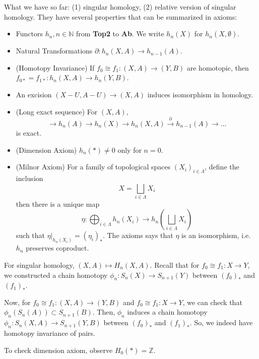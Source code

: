 
What we have so far: (1) singular homology, (2) relative version of singular homology. They have several properties that can be summarized in axioms:

\begin{definition}
	\label{defn:HomologyTheory}
	\begin{itemize}
		\item Functors $h_n, n \in \mathbb{N}$ from \textbf{Top2} to \textbf{Ab}. We write $h_n(X)$ for $h_n(X, \emptyset )$.
		\item Natural Transformations $\partial: h_n(X, A) \to h_{n - 1}(A)$. 
		\item (Homotopy Invariance) If $f_0 \cong f_1: (X, A) \to (Y, B)$ are homotopic, then $f_{0 *} = f_{1 *}: h_n(X, A) \to h_n(Y, B)$.
		\item An excision $\left( X - U, A - U \right) \to (X, A)$ induces isomorphism in homology.
		\item (Long exact sequence) For $(X, A)$, 
			\[
				\to h_n(A) \to h_n(X) \to h_n(X, A) \xrightarrow{\partial} h_{n - 1}(A) \to \ldots
			\] 
			is exact.
		\item (Dimension Axiom) $h_n(*) \neq 0$ only for $n = 0$.
		\item (Milnor Axiom) For a family of topological spaces $(X_i)_{i \in \Lambda}$, define the inclusion
			\[
				X = \bigsqcup_{i \in \Lambda} X_i
			\] 
			then there is a unique map
			\[
				\eta: \bigoplus_{i \in \Lambda} h_n(X_i) \to h_n\left( \bigsqcup_{i \in \Lambda} X_i \right) 
			\] 
			such that $\eta| _{h_n(X_i)} = (\eta_i)_*$.
			The axioms says that $\eta$ is an isomorphism, i.e. $h_n$ preserves coproduct.
	\end{itemize}
\end{definition}

For singular homology, $(X, A) \mapsto H_n(X, A)$. Recall that for $f_0 \cong f_1: X \to Y$, we constructed a chain homotopy $\phi_n: S_n(X) \to S_{n+1}(Y)$ between $(f_0)_*$ and $(f_1)_*$. 

Now, for $f_0 \cong f_1: (X, A) \to (Y, B)$ and $f_0 \cong f_1: X \to Y$, we can check  that $\phi_n(S_n(A)) \subset S_{n + 1}(B)$. Then, $\phi_n$ induces a chain homotopy $\phi_n: S_n(X, A) \to  S_{n + 1}(Y, B)$ between $(f_0)_*$ and $(f_1)_*$. So, we indeed have homotopy invariance of pairs.

To check dimension axiom, observe $H_0(*) = \mathbb{Z}$.

